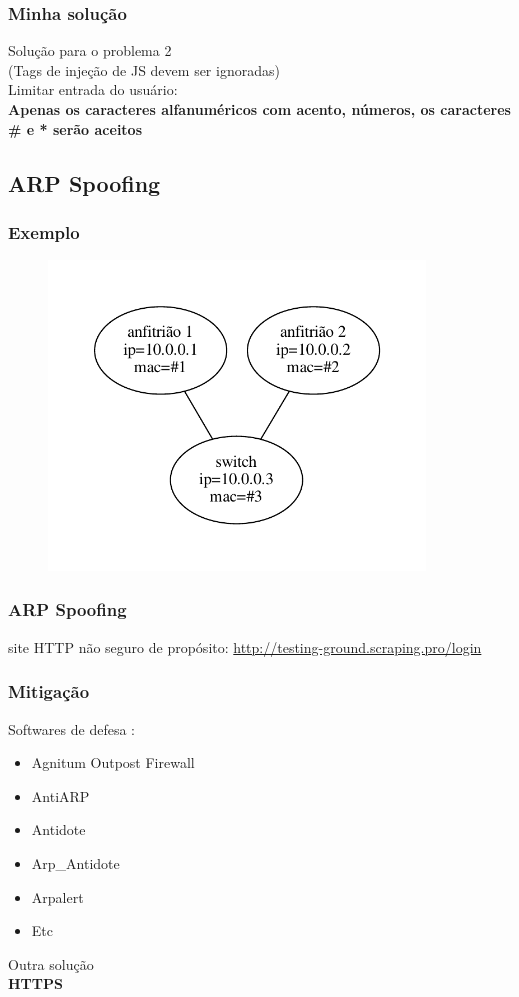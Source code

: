 \documentclass{beamer}
\begin{document}
\begin{frame}
	\frametitle{Minha solução}
	Solução para o problema 2\\
	(Tags de injeção de JS devem ser ignoradas)\\
	Limitar entrada do usuário: \\
	\textbf{Apenas os caracteres alfanuméricos com acento, números, os caracteres \# e * serão aceitos}

\end{frame}

\subsection{ARP Spoofing}
\begin{frame}
\frametitle{Exemplo}
\begin{figure}[htp]
		\includegraphics[width=10cm]{topo.pdf}
	\end{figure}
\end{frame}

\begin{frame}
\frametitle{ARP Spoofing}
	site HTTP não seguro de propósito:
	\url{http://testing-ground.scraping.pro/login}
\end{frame}

\begin{frame}
\frametitle{Mitigação}
	Softwares de defesa :
	\begin{itemize}
		\item Agnitum Outpost Firewall
		\item AntiARP
		\item Antidote
		\item Arp\_Antidote
		\item Arpalert
		\item Etc
	\end{itemize}
	Outra solução\\
	\textbf{HTTPS}
\end{frame}
\end{document}
